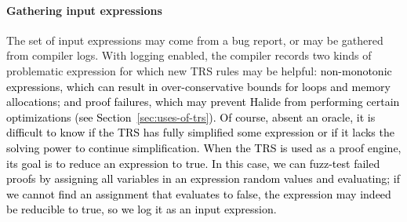 \documentclass[acmsmall,review]{acmart}\settopmatter{printfolios=true,printccs=false,printacmref=false}
\newcommand{\modified}[1]{\textcolor{black}{{#1}}}
\begin{document}
\paragraph{Gathering input expressions}
The set of input expressions may come from a bug report, or may be gathered from compiler logs. With logging enabled, the compiler records two
kinds of problematic expression for which new TRS rules may be helpful:
\modified{non-monotonic expressions, which can result in over-conservative
bounds for loops and memory allocations; and proof failures,
which may prevent Halide from performing certain optimizations
(see Section~\ref{sec:uses-of-trs}). 
Of course, absent an oracle, it is difficult to know if the TRS has fully simplified 
some expression or if it lacks the solving power to continue simplification. 
When the TRS is used as a proof engine, its goal is to reduce an expression to true.
In this case, we can fuzz-test failed proofs by assigning all variables in an expression
random values and evaluating; if we cannot find an assignment that evaluates to false,
the expression may indeed be reducible to true, so we log it as an input expression.}
\end{document}
